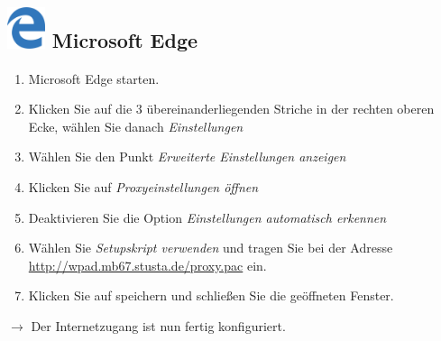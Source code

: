 \documentclass[a4paper,12pt]{scrartcl}
\begin{document}
\subsection*{\includegraphics[height=1.2cm,keepaspectratio]{Bilder/Mcrosoft_Edge_logo} Microsoft Edge}
\begin{enumerate}
	\item Microsoft Edge starten.
	\item Klicken Sie auf die 3 übereinanderliegenden Striche in der rechten oberen Ecke, wählen Sie danach \emph{Einstellungen}
	\item Wählen Sie den Punkt \emph{Erweiterte Einstellungen anzeigen}
	\item Klicken Sie auf \emph{Proxyeinstellungen öffnen}
	\item Deaktivieren Sie die Option \emph{Einstellungen automatisch erkennen}
	\item Wählen Sie \emph{Setupskript verwenden} und tragen Sie bei der Adresse \\ \url{http://wpad.mb67.stusta.de/proxy.pac} ein.
	\item Klicken Sie auf speichern und schließen Sie die geöffneten 
	Fenster.
\end{enumerate}
$\rightarrow$ Der Internetzugang ist nun fertig konfiguriert.

%
\end{document}
